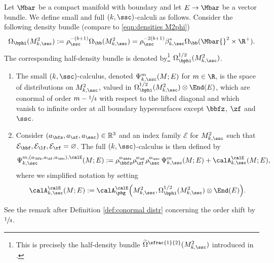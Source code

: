 \begin{defn}\label{def:ksc space}
Let $\Mbar$ be a compact manifold with boundary and let $E\to\Mbar$ be a vector bundle.
We define small and full $(k,\ssc)$-calculi as follows. Consider the
following density bundle (compare to \eqref{eqn:densities M2phi})
\begin{equation}
\Omega_{\bphi}(M^{2}_{k, \ssc}) := \rho_{\ssc}^{-(b+1)}
\Omega_\bb(M^{2}_{k, \ssc}) = \rho_{\ssc}^{-2(b+1)}
\beta_{k, \ssc}^* \Omega_\bb(\Mbar{}^2 \times \R^+).
\end{equation}
The corresponding half-density bundle is denoted by\footnote{This is precisely the
half-density bundle $\widetilde{\Omega}^{\sfrac{1}{2}}(M^{2}_{k, \ssc})$ introduced in
\cite[\S 2.2.2]{guillarmou2008resolvent}.} $\Omega^{1/2}_{\bphi}(M^{2}_{k, \ssc})$.
\begin{enumerate}
\item
The small $(k,\ssc)$-calculus, denoted $\Psi_{k,\ssc}^{m}(M;E)$ for $m\in\R$, is the space of distributions on $M^2_{k,\ssc}$, valued in $\Omega^{1/2}_{\bphi}(M^{2}_{k, \ssc}) \otimes \End(E)$,
which are conormal of order $m-\sfrac14$ with
respect to the lifted diagonal and which vanish to infinite order at all boundary hypersurfaces except $\bbfz$, $\zf$ and $\ssc$.

\item
Consider $(a_{\bfz},a_{\zf},a_{\ssc}) \in \mathbb{R}^{3}$ and an index family $\mathcal{E}$ for $M^{2}_{k, \ssc}$ such that
$\mathcal{E}_{\bbf},\mathcal{E}_{\lf}, \mathcal{E}_{\rf} = \varnothing$.
The full $(k,\ssc)$-calculus is then defined by
\begin{equation}
\label{GH-calculus}
\begin{split}
\Psi_{k,\ssc}^{m,(a_{\bfz},a_{\zf},a_{\ssc}),\calE}(M;E) :=
\rho_{\bbfz}^{a_\bbfz}\rho_\zf^{a_\zf}\rho_\ssc^{a_\ssc}\,\Psi_{k,\ssc}^{m}(M;E) + \calA_{k, \ssc}^\calE(M;E),
\end{split}
\end{equation}
where we simplified notation by setting
\begin{equation}
\begin{split}
\calA_{k, \ssc}^\calE(M;E):= \calA_{\phg}^\calE \Bigl(M^{2}_{k, \ssc},
\Omega^{1/2}_{\bphi} (M^{2}_{k, \ssc})
\otimes \End(E)\Bigr).
\end{split}
\end{equation}
\end{enumerate}
\end{defn}

See the remark after Definition \ref{def:conormal distr} concerning the order shift by $\sfrac14$.

